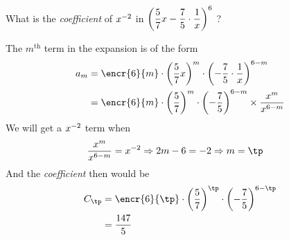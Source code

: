\gcalcexpr[0]

\question[3] What is the \textit{coefficient} of $x^{-2}$ in $\left( \dfrac{5}{7} x - \dfrac{7}{5}\cdot\dfrac{1}{x} \right)^{6}$ ?


\watchout

\ifprintanswers
\fi 

\begin{solution}[\halfpage]
	The $m^{\text{th}}$ term in the expansion is of the form 
	\begin{align}
	   a_m &= \encr{\vbthree}{m}\cdot\left( \vbone x \right)^{m}\cdot\left( -\vbtwo\cdot\dfrac{1}{x}\right)^{\vbthree - m} \\
	   &= \encr{\vbthree}{m}\cdot\left(\vbone\right)^{m}\cdot\left( -\vbtwo \right)^{\vbthree - m}\times\dfrac{x^m}{x^{\vbthree - m}}
	\end{align}
	We will get a $x^{-2}$ term when 
	\begin{align}
		\dfrac{x^m}{x^{\vbthree - m}} &= x^{\vbfour} \Rightarrow 2m - \vbthree = \vbfour \Rightarrow m = \tp
	\end{align}
	And the \textit{coefficient} then would be 
	\begin{align}
		C_{\tp} &= \encr{\vbthree}{\tp}\cdot\left(\vbone\right)^{\tp}\cdot\left( -\vbtwo \right)^{\vbthree - \tp} \\
		&= \vbfive
	\end{align}
\end{solution}
